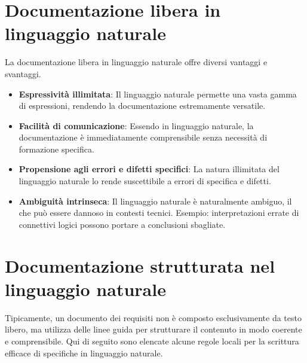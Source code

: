 \section{Documentazione libera in linguaggio naturale}
La documentazione libera in linguaggio naturale offre diversi vantaggi
e svantaggi.

\begin{tcolorbox}[colback=green!5!white,colframe=green!75!black,title=Pro della
    documentazione libera]
\begin{itemize}
    \item \textbf{Espressività illimitata}: Il linguaggio naturale permette una
    vasta gamma di espressioni, rendendo la documentazione estremamente versatile.
    \item \textbf{Facilità di comunicazione}: Essendo in linguaggio naturale, la
    documentazione è immediatamente comprensibile senza necessità di formazione specifica.
\end{itemize}
\end{tcolorbox}

\begin{tcolorbox}[colback=red!5!white,colframe=red!75!black,title=Contro della
    documentazione libera]
\begin{itemize}
    \item \textbf{Propensione agli errori e difetti specifici}: La natura illimitata
    del linguaggio naturale lo rende suscettibile a errori di specifica e difetti.
    \item \textbf{Ambiguità intrinseca}: Il linguaggio naturale è naturalmente ambiguo,
    il che può essere dannoso in contesti tecnici. Esempio: interpretazioni errate
    di connettivi logici possono portare a conclusioni sbagliate.
\end{itemize}
\end{tcolorbox}
\section{Documentazione strutturata nel linguaggio naturale}
Tipicamente, un documento dei requisiti non è composto esclusivamente da testo
libero, ma utilizza delle linee guida per strutturare il contenuto in modo coerente
e comprensibile. Qui di seguito sono elencate alcune regole locali per la scrittura
efficace di specifiche in linguaggio naturale.

